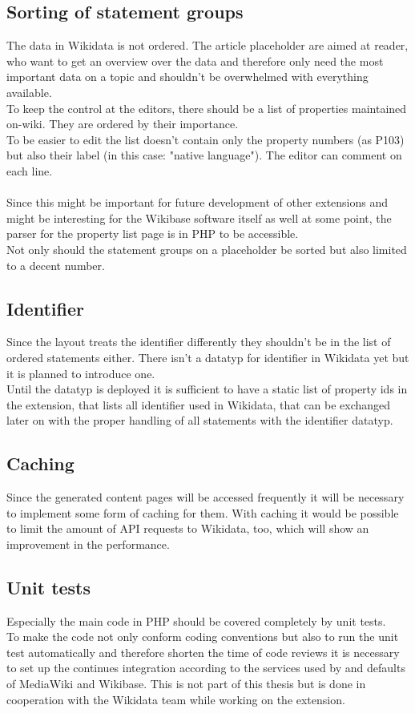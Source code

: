 \documentclass[11pt]{article}
\begin{document}
\subsection{Sorting of statement groups }
The data in Wikidata is not ordered. The article placeholder are aimed at reader, who want to get an overview over the data and therefore only need the most important data on a topic and shouldn't be overwhelmed with everything available. 
\\
To keep the control at the editors, there should be a list of properties maintained on-wiki. They are ordered by their importance. \\
To be easier to edit the list doesn't contain only the property numbers (as P103) but also their label (in this case: "native language"). The editor can comment on each line. \\
\\
Since this might be important for future development of other extensions and might be interesting for the Wikibase software itself as well at some point, the parser for the property list page is in PHP to be accessible. \\
Not only should the statement groups on a placeholder be sorted but also limited to a decent number. 

\subsection {Identifier}
Since the layout treats the identifier differently they shouldn't be in the list of ordered statements either. There isn't a datatyp for identifier in Wikidata yet but it is planned to introduce one. \\
Until the datatyp is deployed it is sufficient to have a static list of property ids in the extension, that lists all identifier used in Wikidata, that can be exchanged later on with the proper handling of all statements with the identifier datatyp. 

\subsection{Caching}
Since the generated content pages will be accessed frequently  it will be necessary to implement some form of caching for them. With caching it would be possible to limit the amount of API requests to Wikidata, too, which will show an improvement in the performance. 

\subsection {Unit tests}
Especially the main code in PHP should be covered completely by unit tests.\\
To make the code not only conform coding conventions but also to run the unit test automatically and therefore shorten the time of code reviews it is necessary to set up the continues integration according to the services used by and defaults of MediaWiki and Wikibase.  This is not part of this thesis but is done in cooperation with the Wikidata team while working on the extension.
\end{document}
